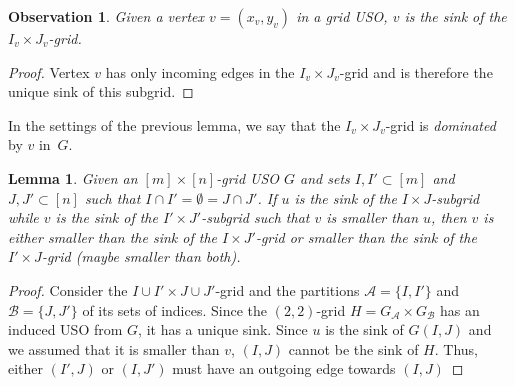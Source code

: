 \documentclass[a4paper,10pt]{article}
\newtheorem{observation}{Observation}
\newtheorem{lemma}{Lemma}
\begin{document}
\begin{observation}\label{Obs:Sink of dominated grid}
Given a vertex  $v = (x_v, y_v)$ in a grid USO, $v$ is the sink of the $I_v\times J_v$-grid.
\end{observation}
\begin{proof}
Vertex $v$ has only incoming edges in the $I_v\times J_v$-grid and is therefore the unique sink of this subgrid. 
\end{proof}

In the settings of the previous lemma, we say that the $I_v\times J_v$-grid is \emph{dominated} by $v$ in~$G$.

\begin{lemma}
Given an $[m]\times[n]$-grid USO $G$ and sets $I, I'\subset [m]$ and $J,J'\subset [n]$ such that $I\cap I' = \emptyset = J\cap J'$. If $u$ is the sink of the $I\times J$-subgrid while $v$ is the sink of the $I'\times J'$-subgrid such that $v$ is smaller than $u$, then $v$ is either smaller than the sink of the $I\times J'$-grid or smaller than the sink of the $I'\times J$-grid (maybe smaller than both).
\end{lemma}
\begin{proof}
Consider the $I\cup I'\times J\cup J'$-grid and the partitions $\mathcal A = \{I, I'\}$ and $\mathcal B = \{J, J'\}$ of its sets of indices. Since the $(2,2)$-grid $H = G_{\mathcal A}\times G_{\mathcal B}$ has an induced USO from $G$, it has a unique sink. Since $u$ is the sink of $G(I, J)$ and we assumed that it is smaller than $v$, $(I,J)$ cannot be the sink of $H$. Thus, either $(I',J)$ or $(I, J')$ must have an outgoing edge towards $(I,J)$

\end{proof}
\end{document}
